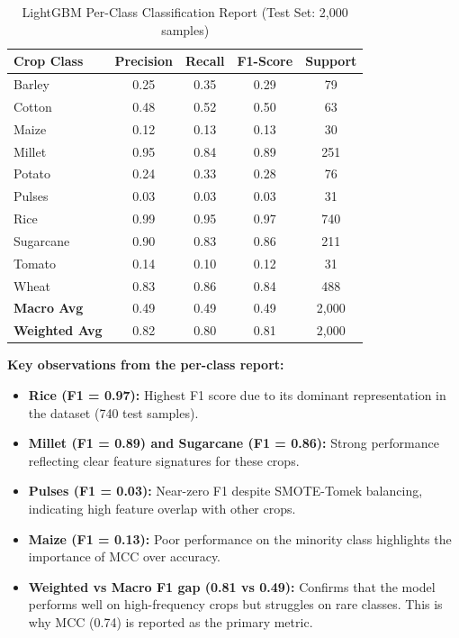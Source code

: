 \documentclass[12pt,a4paper,oneside]{report}
\begin{document}
\begin{table}[H]
\centering
\caption{LightGBM Per-Class Classification Report (Test Set: 2,000 samples)}
\label{tab:lgbm_report}
\renewcommand{\arraystretch}{1.3}
\begin{tabular}{p{3cm} c c c c}
\toprule
\textbf{Crop Class} & \textbf{Precision} & \textbf{Recall} & \textbf{F1-Score} & \textbf{Support} \\
\midrule
Barley    & 0.25 & 0.35 & 0.29 & 79 \\
Cotton    & 0.48 & 0.52 & 0.50 & 63 \\
Maize     & 0.12 & 0.13 & 0.13 & 30 \\
Millet    & 0.95 & 0.84 & 0.89 & 251 \\
Potato    & 0.24 & 0.33 & 0.28 & 76 \\
Pulses    & 0.03 & 0.03 & 0.03 & 31 \\
Rice      & 0.99 & 0.95 & 0.97 & 740 \\
Sugarcane & 0.90 & 0.83 & 0.86 & 211 \\
Tomato    & 0.14 & 0.10 & 0.12 & 31 \\
Wheat     & 0.83 & 0.86 & 0.84 & 488 \\
\midrule
\textbf{Macro Avg} & 0.49 & 0.49 & 0.49 & 2,000 \\
\textbf{Weighted Avg} & 0.82 & 0.80 & 0.81 & 2,000 \\
\bottomrule
\end{tabular}
\end{table}

\textbf{Key observations from the per-class report:}
\begin{itemize}[leftmargin=*, label=$\bullet$]
  \item \textbf{Rice (F1 = 0.97):} Highest F1 score due to its dominant representation in the dataset (740 test samples).
  \item \textbf{Millet (F1 = 0.89) and Sugarcane (F1 = 0.86):} Strong performance reflecting clear feature signatures for these crops.
  \item \textbf{Pulses (F1 = 0.03):} Near-zero F1 despite SMOTE-Tomek balancing, indicating high feature overlap with other crops.
  \item \textbf{Maize (F1 = 0.13):} Poor performance on the minority class highlights the importance of MCC over accuracy.
  \item \textbf{Weighted vs Macro F1 gap (0.81 vs 0.49):} Confirms that the model performs well on high-frequency crops but struggles on rare classes. This is why MCC (0.74) is reported as the primary metric.
\end{itemize}
\end{document}
